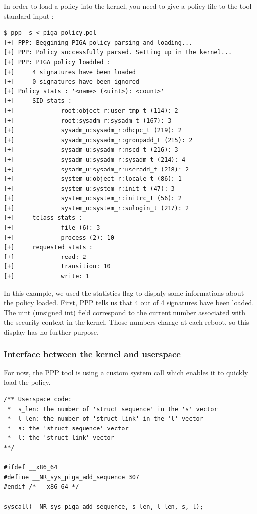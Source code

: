 \documentclass[pdftex,a4paper,titlepage,11pt]{article}
\begin{document}
In order to load a policy into the kernel, you need to give a policy file to the tool standard input :
\begin{lstlisting}
$ ppp -s < piga_policy.pol
[+] PPP: Beggining PIGA policy parsing and loading...
[+] PPP: Policy successfully parsed. Setting up in the kernel...
[+] PPP: PIGA policy loadded :
[+]     4 signatures have been loaded
[+]     0 signatures have been ignored
[+] Policy stats : '<name> (<uint>): <count>'
[+]     SID stats :
[+]             root:object_r:user_tmp_t (114): 2
[+]             root:sysadm_r:sysadm_t (167): 3
[+]             sysadm_u:sysadm_r:dhcpc_t (219): 2
[+]             sysadm_u:sysadm_r:groupadd_t (215): 2
[+]             sysadm_u:sysadm_r:nscd_t (216): 3
[+]             sysadm_u:sysadm_r:sysadm_t (214): 4
[+]             sysadm_u:sysadm_r:useradd_t (218): 2
[+]             system_u:object_r:locale_t (86): 1
[+]             system_u:system_r:init_t (47): 3
[+]             system_u:system_r:initrc_t (56): 2
[+]             system_u:system_r:sulogin_t (217): 2
[+]     tclass stats :
[+]             file (6): 3
[+]             process (2): 10
[+]     requested stats :
[+]             read: 2
[+]             transition: 10
[+]             write: 1
\end{lstlisting}

In this example, we used the statistics flag to dispaly some informations about the policy loaded. First, PPP tells us that 4 out of 4 signatures have been loaded. The uint (unsigned int) field correspond to the current number associated with the security context in the kernel. Those numbers change at each reboot, so this display has no further purpose.



\subsubsection{Interface between the kernel and userspace}

For now, the PPP tool is using a custom system call which enables it to quickly load the policy.

\begin{lstlisting}
/** Userspace code:
 *  s_len: the number of 'struct sequence' in the 's' vector
 *  l_len: the number of 'struct link' in the 'l' vector
 *  s: the 'struct sequence' vector
 *  l: the 'struct link' vector
**/

#ifdef __x86_64
#define __NR_sys_piga_add_sequence 307
#endif /* __x86_64 */

syscall(__NR_sys_piga_add_sequence, s_len, l_len, s, l);
\end{lstlisting}
\end{document}

